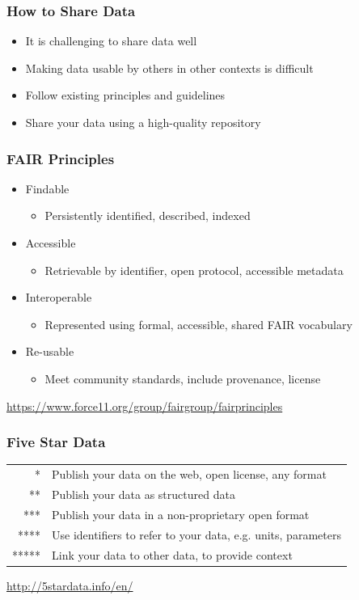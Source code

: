 \documentclass{beamer}
\begin{document}
\begin{frame}
  \frametitle{How to Share Data}
  
  \begin{itemize}
  \item It is challenging to share data well
  \item Making data usable by others in other contexts is difficult
  \item Follow existing principles and guidelines
  \item Share your data using a high-quality repository
  \end{itemize}
\end{frame}

\begin{frame}
  \frametitle{FAIR Principles}
  
  \begin{itemize}
    \item Findable
    \begin{itemize}
      \item Persistently identified, described, indexed
    \end{itemize}
    \item Accessible
    \begin{itemize}
      \item Retrievable by identifier, open protocol, accessible metadata
    \end{itemize}
    \item Interoperable
    \begin{itemize}
      \item Represented using formal, accessible, shared FAIR vocabulary
    \end{itemize}
    \item Re-usable
    \begin{itemize}
      \item Meet community standards, include provenance, license
    \end{itemize}
  \end{itemize}
  \tiny
  \begin{flushright}
    \url{https://www.force11.org/group/fairgroup/fairprinciples}
  \end{flushright}
\end{frame}

\begin{frame}
  \frametitle{Five Star Data}

  \begin{tabular}{rl}
  * & Publish your data on the web, open license, any format \\
  ** & Publish your data as structured data \\
  *** & Publish your data in a non-proprietary open format\\
  **** & Use identifiers to refer to your data, e.g. units, parameters \\
  ***** & Link your data to other data, to provide context \\
  \end{tabular}
  \tiny
  \begin{flushright}
  \url{http://5stardata.info/en/}
  \end{flushright}
\end{frame}
\end{document}
